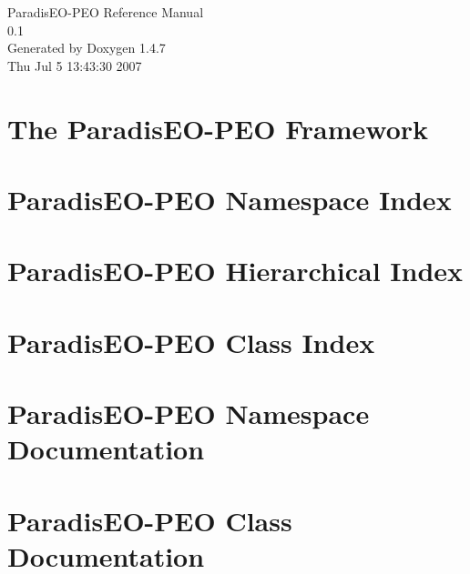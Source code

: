 \documentclass[a4paper]{book}
\begin{document}
\begin{titlepage}
\vspace*{7cm}
\begin{center}
{\Large Paradis\-EO-PEO Reference Manual\\[1ex]\large 0.1 }\\
\vspace*{1cm}
{\large Generated by Doxygen 1.4.7}\\
\vspace*{0.5cm}
{\small Thu Jul 5 13:43:30 2007}\\
\end{center}
\end{titlepage}
\clearemptydoublepage
{}
\tableofcontents
\clearemptydoublepage
{}
\chapter{The Paradis\-EO-PEO Framework }
\label{index}\hypertarget{index}{}
\chapter{Paradis\-EO-PEO Namespace Index}

\chapter{Paradis\-EO-PEO Hierarchical Index}

\chapter{Paradis\-EO-PEO Class Index}

\chapter{Paradis\-EO-PEO Namespace Documentation}

\chapter{Paradis\-EO-PEO Class Documentation}























\printindex
\end{document}
